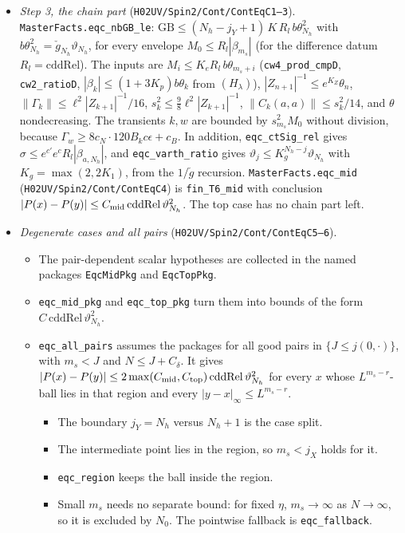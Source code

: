 \documentclass[11pt]{amsart}
\theoremstyle{definition}
\theoremstyle{remark}
\numberwithin{equation}{section}
\begin{document}
\begin{itemize}
\item \emph{Step 3, the chain part} (\texttt{H02UV/Spin2/Cont/ContEqC1--3}). \texttt{MasterFacts.eqc\_nbGB\_le}:
$\mathrm{GB}\le(N_h-j_Y+1)\,K\,R_l\,b\theta_{N_h}^2$ with $b\theta_{N_h}^2=\check g_{N_h}\vartheta_{N_h}$, for every envelope
$M_0\le R_l|\beta_{m_s}|$ (for the difference datum $R_l=\mathrm{cddRel}$). The inputs are $M_i\le K_eR_l\,b\theta_{m_s+i}$
(\texttt{cw4\_prod\_cmpD}, \texttt{cw2\_ratioD}, $|\beta_k|\le(1+3K_p)b\theta_k$ from $(H_\lambda)$),
$|Z_{n+1}|^{-1}\le e^{K_Z}\theta_n$, $\|\Gamma_k\|\le\ell^2|Z_{k+1}|^{-1}/16$, $s_k^2\le\frac98\ell^2|Z_{k+1}|^{-1}$,
$\|C_k(a,a)\|\le s_k^2/14$, and $\theta$ nondecreasing. The transients $k,w$ are bounded by $s_{m_s}^2M_0$ without division,
because $\Gamma_w\ge8c_N\cdot120B_k c\epsilon+c_B$. In addition, \texttt{eqc\_ctSig\_rel} gives $\sigma\le e^{c'}e^{c}R_l|\beta_{a,N_h}|$,
and \texttt{eqc\_varth\_ratio} gives $\vartheta_j\le K_g^{N_h-j}\vartheta_{N_h}$ with $K_g=\max(2,2K_1)$, from the $1/\check g$
recursion. \texttt{MasterFacts.eqc\_mid} (\texttt{H02UV/Spin2/Cont/ContEqC4}) is \texttt{fin\_T6\_mid} with conclusion
$|P(x)-P(y)|\le C_{\rm mid}\,\mathrm{cddRel}\,\vartheta_{N_h}^2$. The top case has no chain part left.
\item \emph{Degenerate cases and all pairs} (\texttt{H02UV/Spin2/Cont/ContEqC5--6}).
\begin{itemize}
\item The pair-dependent scalar hypotheses are collected in the named packages \texttt{EqcMidPkg} and \texttt{EqcTopPkg}.
\item \texttt{eqc\_mid\_pkg} and \texttt{eqc\_top\_pkg} turn them into bounds of the form $C\,\mathrm{cddRel}\,\vartheta_{N_h}^2$.
\item \texttt{eqc\_all\_pairs} assumes the packages for all good pairs in $\{J\le j(0,\cdot)\}$, with $m_s<J$ and $N\le J+C_\delta$.
It gives $|P(x)-P(y)|\le2\max(C_{\rm mid},C_{\rm top})\,\mathrm{cddRel}\,\vartheta_{N_h}^2$ for every $x$ whose
$L^{m_s-r}$-ball lies in that region and every $|y-x|_\infty\le L^{m_s-r}$.
\begin{itemize}
\item The boundary $j_Y=N_h$ versus $N_h+1$ is the case split.
\item The intermediate point lies in the region, so $m_s<j_X$ holds for it.
\item \texttt{eqc\_region} keeps the ball inside the region.
\item Small $m_s$ needs no separate bound: for fixed $\eta$, $m_s\to\infty$ as $N\to\infty$, so it is excluded by $N_0$. The
pointwise fallback is \texttt{eqc\_fallback}.
\end{itemize}
\end{itemize}
\end{itemize}
\end{document}

